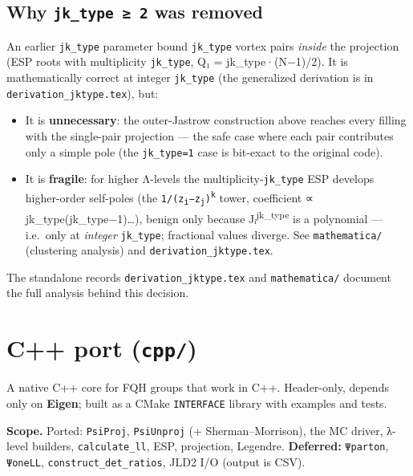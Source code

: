 \documentclass[11pt]{article}
\newcommand{\code}[1]{\texttt{#1}}
\begin{document}
\subsection*{Why \code{jk\_type ≥ 2} was removed}
An earlier \code{jk\_type} parameter bound \code{jk\_type} vortex pairs \emph{inside} the
projection (ESP roots with multiplicity \code{jk\_type}, Q₁ = jk\_type·(N−1)/2). It is
mathematically correct at integer \code{jk\_type} (the generalized derivation is in
\code{derivation\_jktype.tex}), but:
\begin{itemize}
\item It is \textbf{unnecessary}: the outer-Jastrow construction above reaches every filling
  with the single-pair projection --- the safe case where each pair contributes only a simple
  pole (the \code{jk\_type=1} case is bit-exact to the original code).
\item It is \textbf{fragile}: for higher Λ-levels the multiplicity-\code{jk\_type} ESP develops
  higher-order self-poles (the \code{1/(z\textsubscript{i}−z\textsubscript{j})\textsuperscript{k}}
  tower, coefficient ∝ jk\_type(jk\_type−1)…), benign only because Jᵢ\textsuperscript{jk\_type}
  is a polynomial --- i.e.\ only at \emph{integer} \code{jk\_type}; fractional values diverge.
  See \code{mathematica/} (clustering analysis) and \code{derivation\_jktype.tex}.
\end{itemize}
The standalone records \code{derivation\_jktype.tex} and \code{mathematica/} document the full
analysis behind this decision.

\section{C++ port (\code{cpp/})}

A native C++ core for FQH groups that work in C++. Header-only, depends only on \textbf{Eigen};
built as a CMake \code{INTERFACE} library with examples and tests.

\textbf{Scope.} Ported: \code{PsiProj}, \code{PsiUnproj} (+ Sherman--Morrison),
the MC driver, λ-level builders, \code{calculate\_ll}, ESP, projection, Legendre.
\textbf{Deferred:} \code{Ψparton}, \code{ΨoneLL}, \code{construct\_det\_ratios}, JLD2 I/O (output is CSV).
\end{document}
